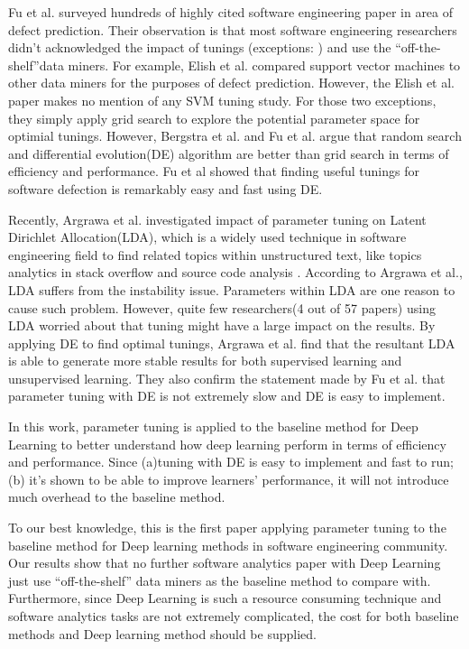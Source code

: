 Fu et al.\cite{fu2016tuning} surveyed hundreds of highly 
cited software engineering paper in area of defect prediction. 
Their observation is that most software engineering  researchers
didn't acknowledged the impact of tunings 
(exceptions: \cite{lessmann2008benchmarking,tantithamthavorn2016automated}) and
use the ``off-the-shelf''data miners. For example, 
Elish et al.\cite{elish2008predicting} compared support vector machines
to other data miners for the purposes of defect prediction.
However, the Elish et al. paper makes no mention of any SVM tuning study.
For those two exceptions\cite{lessmann2008benchmarking,tantithamthavorn2016automated}, 
they simply apply grid search to explore the potential parameter space for optimial tunings.
However, Bergstra et al.\cite{bergstra2012random} and 
Fu et al.\cite{fu2016differential} argue that random search and 
differential evolution(DE) algorithm are better than 
grid search in terms of efficiency and performance.
Fu et al showed that finding useful tunings for software defection is remarkably easy and fast using DE.

Recently, Argrawa et al.\cite{agrawal2016wrong} investigated 
impact of parameter tuning on Latent Dirichlet Allocation(LDA),
which is a widely used technique in software engineering field
to find related topics within unstructured text, 
like topics analytics in stack overflow \cite{barua2014developers}
and source code analysis \cite{binkley2014understanding}.
According to Argrawa et al., LDA suffers from the instability issue.
Parameters within LDA are one reason to cause such problem. However,
quite few researchers(4 out of 57 papers) using LDA worried about
that tuning might have a large impact on the results. By applying DE to find 
optimal tunings,  Argrawa et al. find that the resultant LDA is able to generate more stable results
for both supervised learning and unsupervised learning.
They also confirm the statement made by Fu et al.\cite{fu2016tuning} that
parameter tuning with DE is not extremely slow and DE is easy to implement.

In this work, parameter tuning is applied to the baseline method for Deep Learning
to better understand how deep learning perform in terms of efficiency and performance.
Since (a)tuning with DE is easy to implement and fast to run; (b) it's shown to be able
to improve learners' performance, it will not introduce much overhead to the baseline method.

To our best knowledge, this is the first paper
applying parameter tuning to the baseline method for Deep learning methods in 
software engineering community. Our results show that no further software analytics
paper with Deep Learning just use ``off-the-shelf'' data miners as the baseline
method to compare with. Furthermore, since Deep Learning is such a resource consuming
technique and software analytics tasks are not extremely complicated, the cost for 
both baseline methods and Deep learning method should be supplied.











